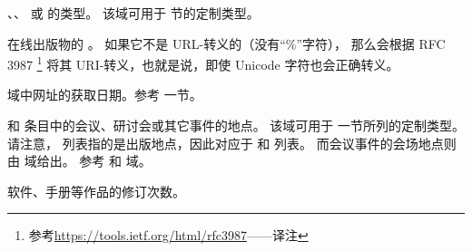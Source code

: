 \begin{fieldlist}
、、 或  的类型。
该域可用于  节的定制类型。




在线出版物的 。
如果它不是 URL-转义的（没有“\%”字符），
那么会根据 RFC 3987 \footnote{
	参考\url{https://tools.ietf.org/html/rfc3987}——译注}
将其 URI-转义，也就是说，即使 Unicode 字符也会正确转义。




 域中网址的获取日期。参考  一节。




 和  条目中的会议、研讨会或其它事件的地点。
该域可用于  一节所列的定制类型。
请注意， 列表指的是出版地点，因此对应于  和  列表。
而会议事件的会场地点则由  域给出。
参考  和  域。




软件、手册等作品的修订次数。



\end{fieldlist}
